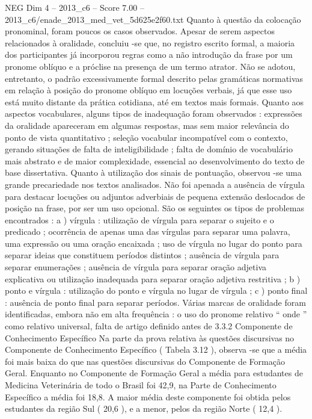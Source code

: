 \begin{textsample}{NEG Dim 4 – 2013\_c6 – Score 7.00 – 2013\_c6/enade\_2013\_med\_vet\_5d625e2f60.txt}
Quanto à questão da colocação pronominal, foram poucos os casos observados.
Apesar de serem aspectos relacionados à oralidade, concluiu -se que, no registro escrito formal, a maioria dos participantes já incorporou regras como a não introdução da frase por um pronome oblíquo e a próclise na presença de um termo atrator.
Não se adotou, entretanto, o padrão excessivamente formal descrito pelas gramáticas normativas em relação à posição do pronome oblíquo em locuções verbais, já que esse uso está muito distante da prática cotidiana, até em textos mais formais.
Quanto aos aspectos vocabulares, alguns tipos de inadequação foram observados : expressões da oralidade apareceram em algumas respostas, mas sem maior relevância do ponto de vista quantitativo ; seleção vocabular incompatível com o contexto, gerando situações de falta de inteligibilidade ; falta de domínio de vocabulário mais abstrato e de maior complexidade, essencial ao desenvolvimento do texto de base dissertativa.
Quanto à utilização dos sinais de pontuação, observou -se uma grande precariedade nos textos analisados.
Não foi apenada a ausência de vírgula para destacar locuções ou adjuntos adverbiais de pequena extensão deslocados de posição na frase, por ser um uso opcional.
São os seguintes os tipos de problemas encontrados : a ) vírgula : utilização de vírgula para separar o sujeito e o predicado ; ocorrência de apenas uma das vírgulas para separar uma palavra, uma expressão ou uma oração encaixada ; uso de vírgula no lugar do ponto para separar ideias que constituem períodos distintos ; ausência de vírgula para separar enumerações ; ausência de vírgula para separar oração adjetiva explicativa ou utilização inadequada para separar oração adjetiva restritiva ; b ) ponto e vírgula : utilização do ponto e vírgula no lugar de vírgula ; c ) ponto final : ausência de ponto final para separar períodos.
Várias marcas de oralidade foram identificadas, embora não em alta frequência : o uso do pronome relativo “ onde ” como relativo universal, falta de artigo definido antes de 3.3.2 Componente de Conhecimento Específico Na parte da prova relativa às questões discursivas no Componente de Conhecimento Específico ( Tabela 3.12 ), observa -se que a média foi mais baixa do que nas questões discursivas do Componente de Formação Geral.
Enquanto no Componente de Formação Geral a média para estudantes de Medicina Veterinária de todo o Brasil foi 42,9, na Parte de Conhecimento Específico a média foi 18,8.
A maior média deste componente foi obtida pelos estudantes da região Sul ( 20,6 ), e a menor, pelos da região Norte ( 12,4 ).

\end{textsample}
